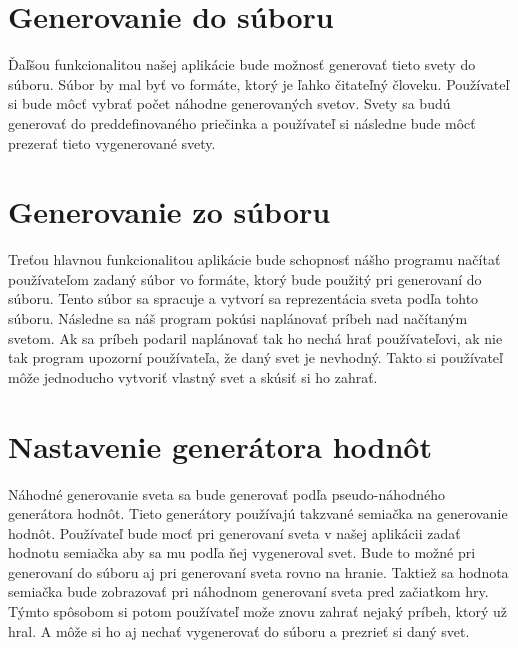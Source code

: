 \section{Generovanie do súboru}
Ďaľšou funkcionalitou našej aplikácie bude možnosť generovať tieto svety do súboru. Súbor by mal byť vo formáte, ktorý je ľahko čitateľný človeku. Používateľ si bude môcť vybrať počet náhodne generovaných svetov. Svety sa budú generovať do preddefinovaného priečinka a používateľ si následne bude môcť prezerať tieto vygenerované svety.\par
\section{Generovanie zo súboru}
Treťou hlavnou funkcionalitou aplikácie bude schopnosť nášho programu načítať používateľom zadaný súbor vo formáte, ktorý bude použitý pri generovaní do súboru. Tento súbor sa spracuje a vytvorí sa reprezentácia sveta podľa tohto súboru. Následne sa náš program pokúsi naplánovať príbeh nad načítaným svetom. Ak sa príbeh podaril naplánovať tak ho nechá hrať používateľovi, ak nie tak program upozorní používateľa, že daný svet je nevhodný. Takto si používateľ môže jednoducho vytvoriť vlastný svet a skúsiť si ho zahrať.\par
\section{Nastavenie generátora hodnôt}
Náhodné generovanie sveta sa bude generovať podľa pseudo-náhodného generátora hodnôt. Tieto generátory používajú takzvané semiačka na generovanie hodnôt. Používateľ bude mocť pri generovaní sveta v našej aplikácii zadať hodnotu semiačka aby sa mu podľa ňej vygeneroval svet. Bude to možné pri generovaní do súboru aj pri generovaní sveta rovno na hranie. Taktiež sa hodnota semiačka bude zobrazovať pri náhodnom generovaní sveta pred začiatkom hry. Týmto spôsobom si potom používateľ može znovu zahrať nejaký príbeh, ktorý už hral. A môže si ho aj nechať vygenerovať do súboru a prezrieť si daný svet.